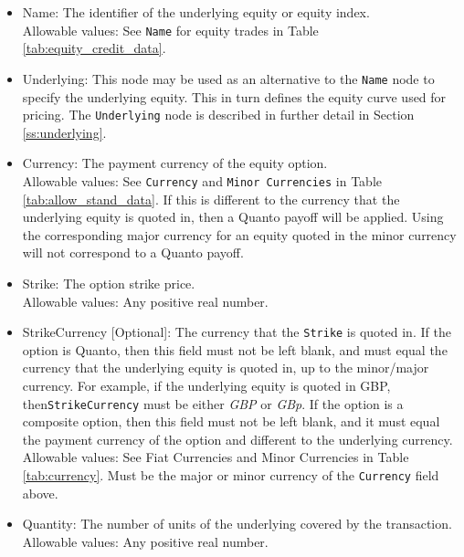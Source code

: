 \begin{itemize}
	\item Name: The identifier of the underlying equity or equity index. \\
	Allowable values: See \lstinline!Name! for equity trades in Table \ref{tab:equity_credit_data}.
	\item Underlying: This node may be used as an alternative to the \lstinline!Name! node to
	specify the underlying equity. This in turn defines the equity curve used for pricing. The
	\lstinline!Underlying! node is described in further detail in Section \ref{ss:underlying}. \\
	\item Currency: The payment currency of the equity option. \\
	Allowable values: See \lstinline!Currency! and \lstinline!Minor Currencies! in Table
	\ref{tab:allow_stand_data}.	If this is different to the currency that the underlying equity
	is quoted in, then a Quanto payoff will be applied. Using the corresponding major currency
	for an equity quoted in the minor currency will not correspond to a Quanto payoff.
	\item Strike: The option strike price.\\
	Allowable values: Any positive real number.	
	\item StrikeCurrency [Optional]: The currency that the \lstinline!Strike! is quoted in. If
	the option is Quanto, then this field must not be left blank, and must equal the currency
	that the underlying equity is quoted in, up to the minor/major currency. For example, if 
	the underlying equity is quoted in GBP, then\lstinline!StrikeCurrency! must be either
	\emph{GBP} or \emph{GBp}. If the option is a composite option, then this field must not be 
	left blank, and it must equal the payment currency of the option and different to the 
	underlying currency.\\
	Allowable values: See Fiat Currencies and Minor Currencies in Table
	\ref{tab:currency}.	Must be the major or minor currency of the \lstinline!Currency!
	field above.
	\item Quantity: The number of units of the underlying covered by the transaction. \\
	Allowable values: Any positive real number.
\end{itemize}
